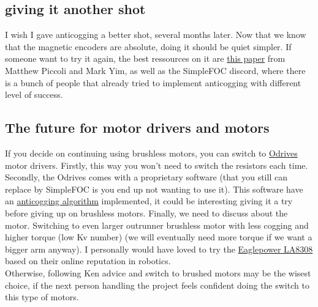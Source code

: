 \documentclass{article}
\begin{document}
\subsection{giving it another shot}

I wish I gave anticogging a better shot, several months later. Now that we know that the magnetic encoders are absolute, doing it should be quiet simpler. If someone want to try it again, the best ressources on it are \href{https://journals.sagepub.com/doi/full/10.1177/0278364915599045?casa_token=rXEpy4RR2b4AAAAA%3An0zk0MuxU2VKAQfZvDpCbwfNJZN7z-cub-tc2vSaLbtJPjbvZIVDb46b-iy0LtBiuBTFB1NyaS-JtA}{this paper} from Matthew Piccoli and Mark Yim, as well as the SimpleFOC discord, where there is a bunch of people that already tried to implement anticogging with different level of success.

\subsection{The future for motor drivers and motors}

If you decide on continuing using brushless motors, you can switch to \href{https://shop.odriverobotics.com/collections/motor-controllers/products/odrive-s1}{Odrives} motor drivers. Firstly, this way you won't need to switch the resistors each time. Secondly, the Odrives comes with a proprietary software (that you still can replace by SimpleFOC is you end up not wanting to use it). This software have an \href{https://docs.odriverobotics.com/v/latest/guides/anticogging.html}{anticogging algorithm} implemented, it could be interesting giving it a try before giving up on brushless motors.
\vspace{0.1cm}
Finally, we need to discuss about the motor. Switching to even larger outrunner brushless motor with less cogging and higher torque (low Kv number) (we will eventually need more torque if we want a bigger arm anyway). I personally would have loved to try the \href{https://www.aliexpress.us/item/3256807604192884.html?spm=a2g0o.productlist.main.17.110a7a10fF2ZxF&algo_pvid=a8f2c4a3-ed99-4828-aacc-8326e2a51cb4&algo_exp_id=a8f2c4a3-ed99-4828-aacc-8326e2a51cb4-8&pdp_ext_f=%7B%22order%22%3A%2220%22%2C%22eval%22%3A%221%22%7D&pdp_npi=4%40dis%21USD%2153.00%2153.00%21%21%2153.00%2153.00%21%40210390b817416169538974055ed688%2112000042212426335%21sea%21US%211753908079%21X&curPageLogUid=49xMA16m3Zkb&utparam-url=scene%3Asearch%7Cquery_from%3A}{Eaglepower LA8308} based on their online reputation in robotics.
\\
Otherwise, following Ken advice and switch to brushed motors may be the wisest choice, if the next person handling the project feels confident doing the switch to this type of motors.
\end{document}
